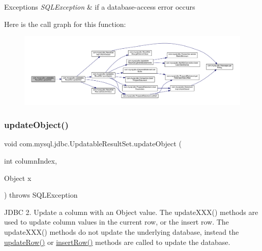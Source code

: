 \begin{DoxyExceptions}{Exceptions}
{\em S\+Q\+L\+Exception} & if a database-\/access error occurs \\
\hline
\end{DoxyExceptions}
Here is the call graph for this function\+:
\nopagebreak
\begin{figure}[H]
\begin{center}
\leavevmode
\includegraphics[width=350pt]{classcom_1_1mysql_1_1jdbc_1_1_updatable_result_set_a6c296ecb4dc31d5ab887aa35b37c3996_cgraph}
\end{center}
\end{figure}
\mbox{\label{classcom_1_1mysql_1_1jdbc_1_1_updatable_result_set_aa7aa1f38330acdf684c1b9d8e8c2fb95}} 
\subsubsection{\texorpdfstring{update\+Object()}{updateObject()}\hspace{0.1cm}{\footnotesize\ttfamily [1/4]}}
{\footnotesize\ttfamily void com.\+mysql.\+jdbc.\+Updatable\+Result\+Set.\+update\+Object (\begin{DoxyParamCaption}\item[{int}]{column\+Index,  }\item[{Object}]{x }\end{DoxyParamCaption}) throws S\+Q\+L\+Exception}

J\+D\+BC 2. Update a column with an Object value. The update\+X\+X\+X() methods are used to update column values in the current row, or the insert row. The update\+X\+X\+X() methods do not update the underlying database, instead the \mbox{\hyperlink{classcom_1_1mysql_1_1jdbc_1_1_updatable_result_set_a919969ba4b3c7cbc7b18605e9f31a746}{update\+Row()}} or \mbox{\hyperlink{classcom_1_1mysql_1_1jdbc_1_1_updatable_result_set_aef041f8d9d0778083716fc26652648fa}{insert\+Row()}} methods are called to update the database.


